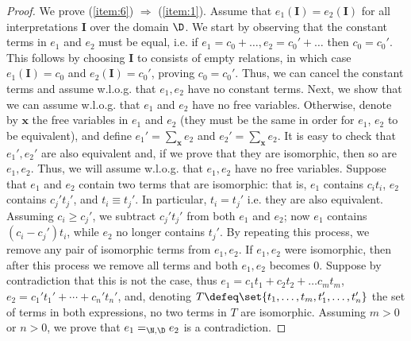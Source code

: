 \begin{proof} We prove (\ref{item:6}) $\Rightarrow$ (\ref{item:1}).
  Assume that $e_1(\pmb{I})=e_2(\pmb{I})$ for all interpretations $\pmb{I}$ over the domain $\D$.  We start by observing that the constant terms in $e_1$ and $e_2$ must be equal, i.e. if $e_1 = c_0 + \ldots, e_2 = c_0' + \ldots$ then $c_0 = c_0'$.  This follows by choosing $\pmb{I}$ to consists of empty relations, in which case $e_1(\pmb{I})=c_0$ and $e_2(\pmb{I})=c_0'$, proving $c_0=c_0'$.  Thus, we can cancel the constant terms and assume w.l.o.g. that $e_1,e_2$ have no constant terms.
Next, we show that we can  assume w.l.o.g. that  $e_1$ and $e_2$ have no free variables.  Otherwise, denote by $\pmb{x}$ the free variables in $e_1$ and $e_2$ (they must be the same in order for $e_1$, $e_2$ to be equivalent), and define $e_1' = \sum_{\pmb{x}} e_2$ and $e_2' = \sum_{\pmb{x}} e_2$.  It is easy to check that $e_1', e_2'$ are also equivalent and, if we prove that they are isomorphic, then so are $e_1, e_2$.  Thus, we will assume w.l.o.g. that $e_1, e_2$ have no free variables.
%
% 
% 
% 
Suppose that $e_1$ and $e_2$ contain two terms that are isomorphic: that is, $e_1$ contains $c_it_i$, $e_2$ contains $c_j't_j'$, and $t_i \equiv t_j'$.  In particular, $t_i=t_j'$ i.e. they are also equivalent.  Assuming $c_i \geq c_j'$, we subtract $c_j't_j'$ from both $e_1$ and $e_2$; now $e_1$ contains $(c_i - c_j')t_i$, while $e_2$ no longer contains $t_j'$.  By repeating this process, we remove any pair of isomorphic terms from $e_1, e_2$.  If $e_1, e_2$ were isomorphic, then after this process we remove all terms and both $e_1, e_2$ becomes 0.  Suppose by contradiction that this is not the case, thus $e_1 = c_1 t_1 + c_2 t_2 + \ldots c_m t_m$, $e_2 = c_1' t_1' + \cdots + c_n' t_n'$, and, denoting $T \defeq \set{t_1, \ldots, t_m, t_1', \ldots, t_n'}$ the set of terms in both expressions, no two terms in $T$ are isomorphic.  Assuming $m >0$ or $n > 0$, we prove that $e_1 =_{\N,\D} e_2$ is a contradiction.



\end{proof}
